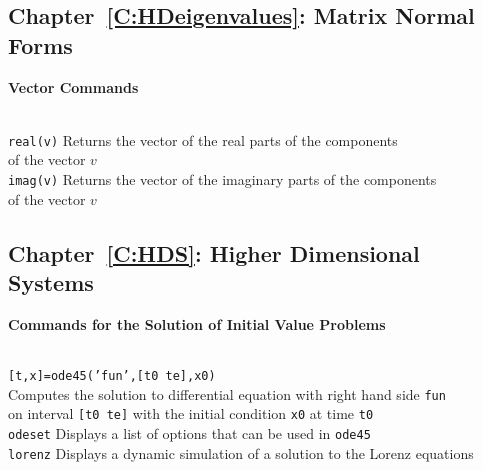 \documentclass{ximera}
\begin{document}
\subsection*{Chapter~\ref{C:HDeigenvalues}: Matrix Normal Forms}


\centerline{
{\bf Vector Commands}
} \vspace*{-0.1in}
 
\begin{tabbing}
 \hspace{1.2in} \= \\

     {\tt real(v)}   \>
 Returns the vector of the real parts of the components \\
\> of the vector $v$ \\

     {\tt imag(v)}   \>
 Returns the vector of the imaginary parts of the components \\
\> of the vector $v$ 


\end{tabbing}


\subsection*{Chapter~\ref{C:HDS}: Higher Dimensional Systems}



\centerline{
{\bf Commands for the Solution of Initial Value Problems}
} \vspace*{-0.1in}
 
\begin{tabbing}
 \hspace{1.1in} \= \\

     {\tt [t,x]=ode45('fun',[t0 te],x0)}   \> \\
\>  Computes the solution to differential equation with
			right hand side {\tt fun} \\
\>			on interval {\tt [t0 te]} with the initial 
			condition {\tt x0} at time {\tt t0}   \\
 
     {\tt odeset}   \> 
    Displays a list of options that can be used in {\tt ode45}\\

     {\tt lorenz}   \> 
    Displays a dynamic simulation of a solution to the Lorenz equations

\end{tabbing}
\end{document}
